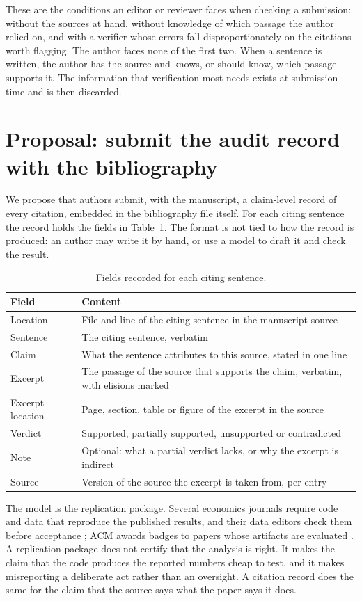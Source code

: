 \documentclass[11pt]{article}
\begin{document}
These are the conditions an editor or reviewer faces when checking a submission: without the sources at hand, without knowledge of which passage the author relied on, and with a verifier whose errors fall disproportionately on the citations worth flagging. The author faces none of the first two. When a sentence is written, the author has the source and knows, or should know, which passage supports it. The information that verification most needs exists at submission time and is then discarded.

\section{Proposal: submit the audit record with the bibliography}

We propose that authors submit, with the manuscript, a claim-level record of every citation, embedded in the bibliography file itself. For each citing sentence the record holds the fields in Table~\ref{tab:fields}. The format is not tied to how the record is produced: an author may write it by hand, or use a model to draft it and check the result.

\begin{table}[t]
\centering
\caption{Fields recorded for each citing sentence.}
\label{tab:fields}
\begin{tabularx}{\linewidth}{@{}lX@{}}
\toprule
Field & Content \\
\midrule
Location & File and line of the citing sentence in the manuscript source \\
Sentence & The citing sentence, verbatim \\
Claim & What the sentence attributes to this source, stated in one line \\
Excerpt & The passage of the source that supports the claim, verbatim, with elisions marked \\
Excerpt location & Page, section, table or figure of the excerpt in the source \\
Verdict & Supported, partially supported, unsupported or contradicted \\
Note & Optional: what a partial verdict lacks, or why the excerpt is indirect \\
Source & Version of the source the excerpt is taken from, per entry \\
\bottomrule
\end{tabularx}
\end{table}

The model is the replication package. Several economics journals require code and data that reproduce the published results, and their data editors check them before acceptance \citep{aea2026datapolicy,es2026reproducibility}; ACM awards badges to papers whose artifacts are evaluated \citep{acm2020badging}. A replication package does not certify that the analysis is right. It makes the claim that the code produces the reported numbers cheap to test, and it makes misreporting a deliberate act rather than an oversight. A citation record does the same for the claim that the source says what the paper says it does.
\end{document}
